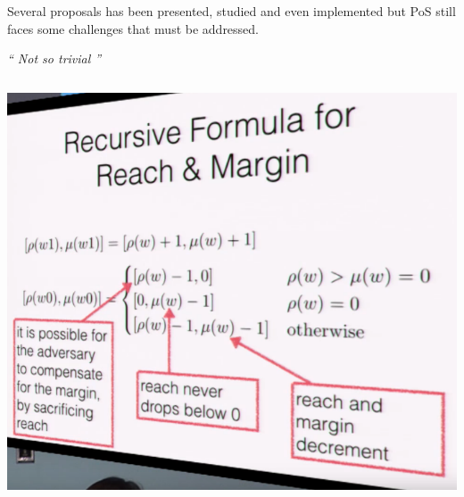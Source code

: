 \documentclass[notitlepage, usenames,dvipsnames]{beamer}
\begin{document}
\begin{frame}
\begin{overlayarea}{\textwidth}{0.85\textheight}
{            \begin{alertblock}{}
                Several proposals has been presented, studied and even implemented but PoS still faces some \alert{challenges} that must be addressed.
            \end{alertblock}

            }

             {
            \vspace{2mm}
            \centering
            {\huge \sl{`` Not so \alert{trivial} ''}}

            \vspace{3ex}
            \begin{columns}[c]
                \includegraphics[scale=0.245]{../img/ouroboros-1.png}


\end{columns}}
\end{overlayarea}
\end{frame}
\end{document}
